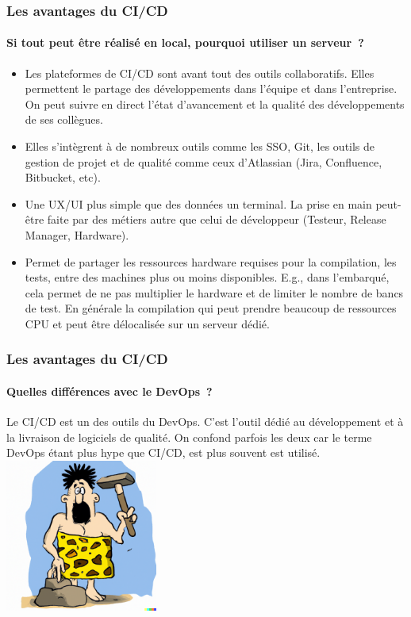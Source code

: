 \documentclass{beamer}
\begin{document}
    \begin{frame}
        \frametitle{Les avantages du CI/CD}
        \framesubtitle{Si tout peut être réalisé en local, pourquoi utiliser un serveur~?}
        \transdissolve
        \begin{itemize}
            \item Les plateformes de CI/CD sont avant tout des outils collaboratifs.
            Elles permettent le partage des développements dans l'équipe et dans l'entreprise.
            On peut suivre en direct l'état d'avancement et la qualité des développements de ses collègues.
            \item Elles s'intègrent à de nombreux outils comme les SSO, Git, les outils de gestion de projet et de qualité comme ceux d'Atlassian (Jira, Confluence, Bitbucket, etc).
            \item Une UX/UI plus simple que des données un terminal.
            La prise en main peut-être faite par des métiers autre que celui de développeur (Testeur, Release Manager, Hardware).
            \item Permet de partager les ressources hardware requises pour la compilation, les tests, entre des machines plus ou moins disponibles.
            E.g., dans l'embarqué, cela permet de ne pas multiplier le hardware et de limiter le nombre de bancs de test.
            En générale la compilation qui peut prendre beaucoup de ressources CPU et peut être délocalisée sur un serveur dédié.
        \end{itemize}
    \end{frame}

    \begin{frame}
        \frametitle{Les avantages du CI/CD}
        \framesubtitle{Quelles différences avec le DevOps~?}
        \transdissolve
        Le CI/CD est un des outils du DevOps.
        \bigbreak
        C'est l'outil dédié au développement et à la livraison de logiciels de qualité.
        On confond parfois les deux car le terme DevOps étant plus hype que CI/CD, est plus souvent est utilisé.
        \bigbreak
        \centering
        \includegraphics[width=5cm]{image/caveman-using-a-sophisticated-tool}
    \end{frame}
\end{document}
